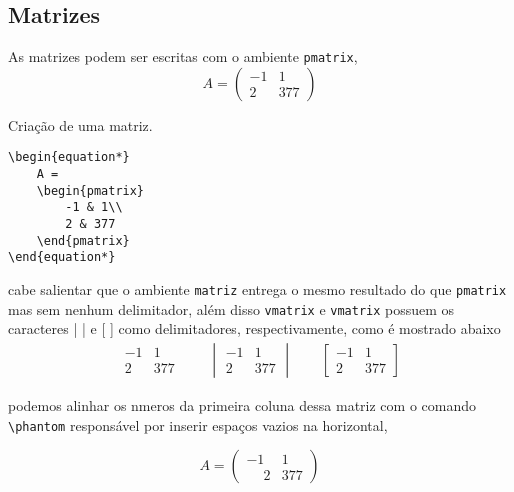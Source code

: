 \newpage

\subsection{Matrizes}
As matrizes podem ser escritas com o ambiente \verb|pmatrix|,
\begin{equation*}
    A = 
    \begin{pmatrix}
        -1 & 1\\
        2 & 377
    \end{pmatrix}     
\end{equation*}

\begin{programcode}{Criação de uma matriz.}
\begin{verbatim}
\begin{equation*}
    A = 
    \begin{pmatrix}
        -1 & 1\\
        2 & 377
    \end{pmatrix}     
\end{equation*}
\end{verbatim}
\end{programcode}

\noindent cabe salientar que o ambiente \verb|matriz| entrega o mesmo resultado do que \verb|pmatrix| mas sem nenhum delimitador, al\'{e}m disso \verb|vmatrix| e \verb|vmatrix| possuem os caracteres | | e [ ] como delimitadores, respectivamente, como \'{e} mostrado abaixo
\begin{align*}
    \begin{matrix}
        -1 & 1\\
        2 & 377
    \end{matrix}
    \qquad
    \begin{vmatrix}
        -1 & 1\\
        2 & 377
    \end{vmatrix}
    \qquad
    \begin{bmatrix}
        -1 & 1\\
        2 & 377
    \end{bmatrix}
\end{align*}

\noindent podemos alinhar os nmeros da primeira coluna dessa matriz com o comando \verb|\phantom| respons\'{a}vel por inserir espa\c cos vazios na horizontal,

\begin{equation*}
    A = 
    \begin{pmatrix}
        -1 & 1\\
        \phantom{-}2 & 377
    \end{pmatrix}     
\end{equation*}

